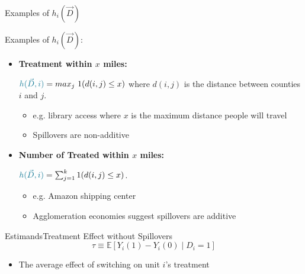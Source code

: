 \documentclass[aspectratio=169,t]{beamer}
\begin{document}
\begin{frame}{Examples of $h_i(\vec{D})$}
    
    Examples of $h_i(\vec{D})$:
    
    \begin{itemize}
        \item \textbf{Treatment within $x$ miles:}
        
        $\textcolor{alice}{h(\vec{D}, i)} = max_j \ 1(d(i, j) \leq x)$ where $d(i,j)$ is the distance between counties $i$ and $j$. 

        \begin{itemize}
            \item e.g. library access where $x$ is the maximum distance people will travel
            
            \item Spillovers are non-additive
        \end{itemize}
        
        \vspace{2.5mm}
        \item \textbf{Number of Treated within $x$ miles:}
        
        $\textcolor{alice}{h(\vec{D}, i)} = \sum_{j = 1}^k 1(d(i, j) \leq x)$. 

        \begin{itemize}
            \item e.g. Amazon shipping center
            
            \item Agglomeration economies suggest spillovers are additive
        \end{itemize}

    \end{itemize}
\end{frame}

\begin{frame}{Estimands}{Treatment Effect without Spillovers}
    \[
        \tau \equiv \mathbb{E} \left[ Y_i(1) - Y_i(0) \mid D_i = 1\right]
    \]
    \vspace{5mm}

    \begin{itemize}
        \item The average effect of switching on unit $i$'s treatment
    \end{itemize}

    \vspace{60mm}
\end{frame}
\end{document}
